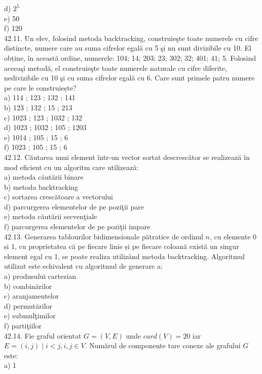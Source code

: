 \begin{itemize}
\begin{enumerate}
d) $2^{5}$
\\
e) 50
\\
f) 120
\\
42.11. Un elev, folosind metoda backtracking, construieşte toate numerele cu cifre distincte, numere care au suma cifrelor egală cu 5 şi nu sunt divizibile cu 10. El obține, în această ordine, numerele: 104; 14; 203; 23; 302; 32; 401; 41; 5.
Folosind aceeaşi metodă, el construieşte toate numerele naturale cu cifre diferite, nedivizibile cu 10 şi cu suma cifrelor egală cu 6.
Care sunt primele patru numere pe care le construiește?
\\
a) 114 ; 123 ; 132 ; 141
\\
b) 123 ; 132 ; 15 ; 213
\\
c) 1023 ; 123 ; 1032 ; 132
\\
d) 1023 ; 1032 ; 105 ; 1203
\\
e) 1014 ; 105 ; 15 ; 6
\\
f) 1023 ; 105 ; 15 ; 6
\\
42.12. Căutarea unui element într-un vector sortat descrescător se realizează în mod eficient cu un algoritm care utilizează:
\\
a) metoda căutării binare
\\
b) metoda backtracking
\\
c) sortarea crescătoare a vectorului
\\
d) parcurgerea elementelor de pe poziţii pare
\\
e) metoda căutării secvenţiale
\\
f) parcurgerea elementelor de pe poziţii impare
\\
42.13. Generarea tablourilor bidimensionale pătratice de ordinul $n$, cu elemente 0 și 1, cu proprietatea că pe fiecare linie și pe fiecare coloană există un singur element egal cu 1, se poate realiza utilizând metoda backtracking. Algoritmul utilizat este echivalent cu algoritmul de generare a:
\\
a) produsului cartezian
\\
b) combinărilor
\\
c) aranjamentelor
\\
d) permutărilor
\\
e) submulţimilor
\\
f) partiţiilor
\\
42.14. Fie graful orientat $G=(V, E)$ unde $card(V)=20$ iar $E={(i, j) \mid i<j, i, j \in V}$. Numărul de componente tare conexe ale grafului $G$ este:
\\
a) 1
\\

\end{enumerate}
\end{itemize}
